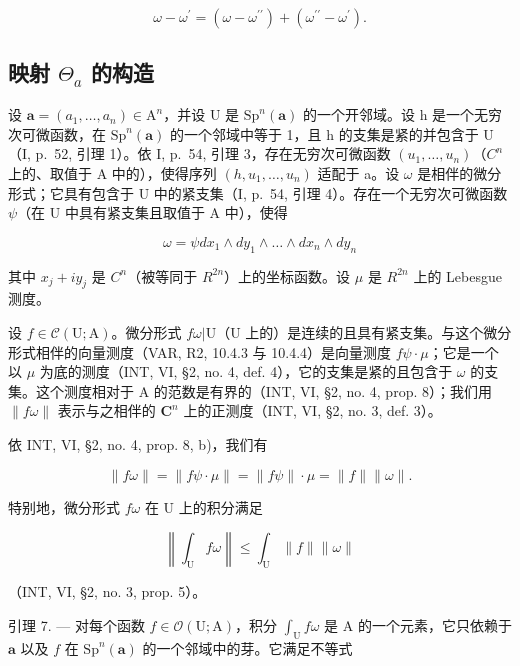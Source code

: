 \[
\omega - \omega^ {\prime} = (\omega - \omega^ {\prime \prime}) + (\omega^ {\prime \prime} - \omega^ {\prime}).
\]

\subsection{\texorpdfstring{映射 \(\Theta_{a}\) 的构造}{映射 \textbackslash Theta\_\{a\} 的构造}}

设 \(\boldsymbol{a}=(a_{1},\ldots,a_{n})\in\mathrm{A}^{n}\)，并设 U 是 \(\mathrm{Sp}^{n}(\boldsymbol{a})\) 的一个开邻域。设 h 是一个无穷次可微函数，在 \(\mathrm{Sp}^{n}(\boldsymbol{a})\) 的一个邻域中等于 1，且 h 的支集是紧的并包含于 U（I, p.~52, 引理 1）。依 I, p.~54, 引理 3，存在无穷次可微函数 \((u_{1},\ldots,u_{n})\)（\(C^{n}\) 上的、取值于 A 中的），使得序列 \((h,u_{1},\ldots,u_{n})\) 适配于 a。设 \(\omega\) 是相伴的微分形式；它具有包含于 U 中的紧支集（I, p.~54, 引理 4）。存在一个无穷次可微函数 \(\psi\)（在 U 中具有紧支集且取值于 A 中），使得

\[
\omega = \psi d x _ {1} \wedge d y _ {1} \wedge \dots \wedge d x _ {n} \wedge d y _ {n}
\]

其中 \(x_{j} + iy_{j}\) 是 \(C^{n}\)（被等同于 \(R^{2n}\)）上的坐标函数。设 \(\mu\) 是 \(R^{2n}\) 上的 Lebesgue 测度。

设 \(f \in \mathcal{C}(\mathrm{U};\mathrm{A})\)。微分形式 \(f\omega|\mathrm{U}\)（\(\mathrm{U}\) 上的）是连续的且具有紧支集。与这个微分形式相伴的向量测度（VAR, R2, 10.4.3 与 10.4.4）是向量测度 \(f\psi \cdot \mu\)；它是一个以 \(\mu\) 为底的测度（INT, VI, §2, no. 4, def. 4），它的支集是紧的且包含于 \(\omega\) 的支集。这个测度相对于 A 的范数是有界的（INT, VI, §2, no. 4, prop. 8）；我们用 \(\| f\omega\|\) 表示与之相伴的 \(\mathbf{C}^n\) 上的正测度（INT, VI, §2, no. 3, def. 3）。

依 INT, VI, §2, no. 4, prop. 8, b)，我们有

\[
\| f \omega \| = \| f \psi \cdot \mu \| = \| f \psi \| \cdot \mu = \| f \| \| \omega \|.
\]

特别地，微分形式 \(f\omega\) 在 U 上的积分满足

\[
\left\| \int_ {\mathrm{U}} f \omega \right\| \leqslant \int_ {\mathrm{U}} \| f \| \| \omega \|
\]

（INT, VI, §2, no. 3, prop. 5）。

引理 7. --- 对每个函数 \(f \in \mathcal{O}(\mathrm{U};\mathrm{A})\)，积分 \(\int_{\mathrm{U}} f\omega\) 是 A 的一个元素，它只依赖于 \(\boldsymbol{a}\) 以及 \(f\) 在 \(\mathrm{Sp}^{n}(\boldsymbol{a})\) 的一个邻域中的芽。它满足不等式

